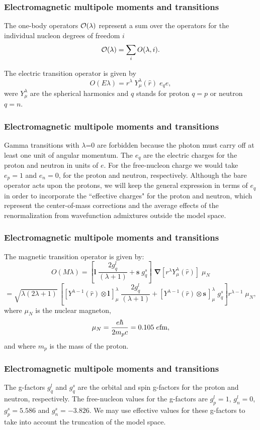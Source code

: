 \documentclass[compress]{beamer}
\renewcommand{\vec}[1]{\mathbf{#1}}
\renewcommand{\vec}[1]{\boldsymbol{#1}}
\begin{document}
\frame
{
\frametitle{Electromagnetic multipole moments and transitions}
\begin{small}
{\scriptsize
The one-body operators $  {\cal O}(\lambda )  $ represent a sum over
the operators for the individual nucleon degrees of freedom  $  i  $
$$
{\cal O}(\lambda ) = \displaystyle\sum _{i} O(\lambda ,i). 
$$


The electric transition operator is given by
$$
O(E\lambda ) = r^{\lambda } \; Y^{\lambda }_{\mu }(\hat{r}) \; e_{q} e, 
$$
were $  Y^{\lambda }_{\mu }  $ are the spherical harmonics
and $  q  $ stands for proton $  q=p  $ or neutron $  q=n  $.

}
\end{small}
}
\frame
{
\frametitle{Electromagnetic multipole moments and transitions}
\begin{small}
{\scriptsize
Gamma transitions
with $\lambda$=0 are forbidden because the photon must carry off
at least one unit of angular momentum. The $  e_{q}  $
are the electric charges for the proton and neutron in units of $  e  $.
For the free-nucleon
charge we would take $  e_{p} = 1  $ and $  e_{n} = 0  $, for the
proton and neutron, respectively.
Although
the bare operator acts upon the protons,
we will keep the general expression in terms of $  e_{q}  $ in order
to incorporate the ``effective charges" for the proton and
neutron, which represent the center-of-mass corrections and the
average effects of the renormalization from wavefunction
admixtures outside the model space.
}
\end{small}
}
\frame
{
\frametitle{Electromagnetic multipole moments and transitions}
\begin{small}
{\scriptsize
The magnetic transition operator is given by:
$$
O(M\lambda ) = \left[\vec{l} \; \frac{2g^{l }_{q}}{(\lambda +1)}
+ \vec{s} \; g^{s}_{q}\right] \; \vec{\nabla}[r^{\lambda } Y^{\lambda }_{\mu }(\hat{r})]
\; \mu _{N}
$$
$$
= \sqrt{\lambda (2\lambda +1)}\,
\left[[Y^{\lambda -1}(\hat{r})\otimes \vec{l}\,]^{\lambda }_{\mu } \; \frac{2g^{l}_{q}}{(\lambda +1)}
+ [Y^{\lambda -1}(\hat{r})\otimes \vec{s}\,]^{\lambda }_{\mu } \; g^{s}_{q}\right]
r^{\lambda -1} \; \mu _{N}, 
$$
 where $\mu_{N}$ is the nuclear magneton,
$$
\mu _{N}=\frac{e\hbar }{2m_{p}c} = 0.105 \; e {\rm fm}, 
$$
and where $  m_{p}  $ is the mass of the proton.
}
\end{small}
}
\frame
{
\frametitle{Electromagnetic multipole moments and transitions}
\begin{small}
{\scriptsize
The g-factors $  g^{l}_{q}  $ and $  g^{s}_{q}  $
are the orbital and spin g-factors
for the proton and neutron, respectively.
The
free-nucleon values for the g-factors are $  g^{l}_{p}=1  $, $  g^{l}_{n}=0  $,
$  g^{s}_{p}=5.586  $ and $  g^{s}_{n} = -3.826  $. We may use effective values
for these g-factors to take into account the truncation of the model
space.
}
\end{small}
}
\end{document}
